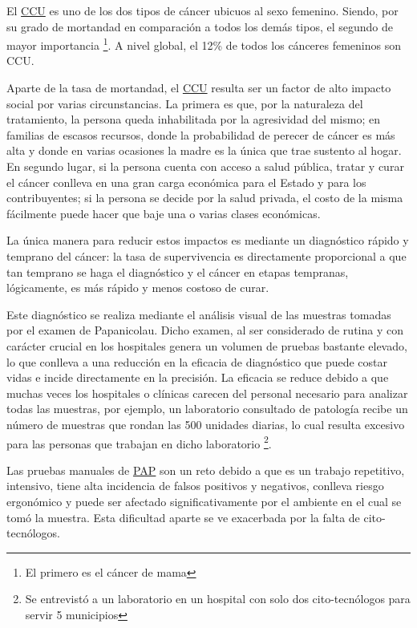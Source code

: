 El \hyperlink{abbr}{CCU} es uno de los dos tipos de cáncer ubicuos al sexo
femenino. Siendo, por su grado de mortandad en comparación a todos los demás
tipos, el segundo de mayor importancia \footnote{El primero es el cáncer de
mama}. A nivel global,  el 12\% de todos los cánceres femeninos son
CCU.~\cite{CancerToday-InstitutionalAgencyforResearchonCancerWHO2018}

Aparte de la tasa de mortandad, el \hyperlink{abbr}{CCU} resulta ser un factor
de alto impacto social por varias circunstancias. La primera es que, por la
naturaleza del tratamiento, la persona queda inhabilitada por la agresividad del
mismo; en familias de escasos recursos, donde la probabilidad de perecer de
cáncer es más alta y donde en varias ocasiones la madre es la única que trae
sustento al hogar. En segundo lugar, si la persona cuenta con acceso a salud
pública, tratar y curar el cáncer conlleva en una gran carga económica para el
Estado y para los contribuyentes; si la persona se decide por la salud privada,
el costo de la misma fácilmente puede hacer que baje una o varias clases
económicas.~\cite{SecretariadeSalud2015a}

La única manera para reducir estos impactos es mediante un diagnóstico rápido y
temprano del cáncer: la tasa de supervivencia es directamente proporcional a que
tan temprano se haga el diagnóstico y el cáncer en etapas tempranas,
lógicamente, es más rápido y menos costoso de curar.~\cite{WorldHealthOrganization}

Este diagnóstico se realiza mediante el análisis visual de las muestras tomadas
por el examen de Papanicolau. Dicho examen, al ser considerado de rutina y con
carácter crucial en los hospitales genera un volumen de pruebas bastante
elevado, lo que conlleva a una reducción en la eficacia de diagnóstico que puede
costar vidas e incide directamente en la precisión. La eficacia se reduce debido
a que muchas veces los hospitales o clínicas carecen del personal necesario para
analizar todas las muestras, por ejemplo, un laboratorio consultado de patología
recibe un número de muestras que rondan las 500 unidades diarias, lo cual
resulta excesivo para las personas que trabajan en dicho laboratorio
\footnote{Se entrevistó a un laboratorio en un hospital con solo dos
cito-tecnólogos para servir 5 municipios}.~\cite{DelMoral2017} 

Las pruebas manuales de \hyperlink{abbr}{PAP} son un reto debido a que es un
trabajo repetitivo, intensivo, tiene alta incidencia de falsos positivos y
negativos, conlleva riesgo ergonómico y puede ser afectado significativamente
por el ambiente en el cual se tomó la muestra. Esta dificultad aparte se ve
exacerbada por la falta de cito-tecnólogos.~\cite{Cucoranu2014}

